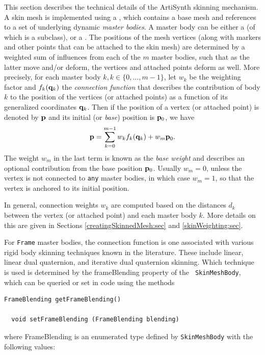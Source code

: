 This section describes the technical details of the ArtiSynth skinning
mechanism. A skin mesh is implemented using a
, which contains a
base mesh and references to a set of underlying dynamic {\it master
bodies}.  A master body can be either a
 (of which
 is a subclass), or a
. The positions of the
mesh vertices (along with markers and other points that can be
attached to the skin mesh) are determined by a weighted sum of
influences from each of the $m$ master bodies, such that as the latter
move and/or deform, the vertices and attached points deform as
well. More precisely, for each master body
$k, k \in \{0, \ldots, m-1\}$, let $w_k$ be the weighting factor and
$f_k({\bf q}_k)$ the {\it connection function} that describes the
contribution of body $k$ to the position of the vertices (or attached
points) as a function of its generalized coordinates ${\bf q}_k$. Then if
the position of a vertex (or attached point) is denoted by ${\bf p}$ and
its initial (or {\it base}) position is ${\bf p}_0$, we have
%
\begin{equation}
{\bf p} = \sum_{k=0}^{m-1} w_k f_k ({\bf q}_k) + w_m {\bf p}_0.
\label{vertexpos:eqn}
\end{equation}
%
The weight $w_m$ in the last term is known as the {\it base weight}
and describes an optional contribution from the base position ${\bf p}_0$.
Usually $w_m = 0$, unless the vertex is not connected to {\tt any}
master bodies, in which case $w_m = 1$, so that the vertex is anchored
to its initial position.

In general, connection weights $w_k$ are computed based on the
distances $d_k$ between the vertex (or attached point) and
each master body $k$. More details on this are given in Sections
\ref{creatingSkinnedMesh:sec} and \ref{skinWeighting:sec}.

For {\tt Frame} master bodies, the connection function is one
associated with various rigid body skinning techniques known in the
literature. These include linear, linear dual quaternion, and
iterative dual quaternion skinning. Which technique is used is
determined by the {\sf frameBlending} property of the {\tt
SkinMeshBody}, which can be queried or set in code using the methods
%
\begin{lstlisting}[]
  FrameBlending getFrameBlending()

  void setFrameBlending (FrameBlending blending)
\end{lstlisting}
%
where %
{FrameBlending}
is an enumerated type defined by {\tt SkinMeshBody} with the following
values:


